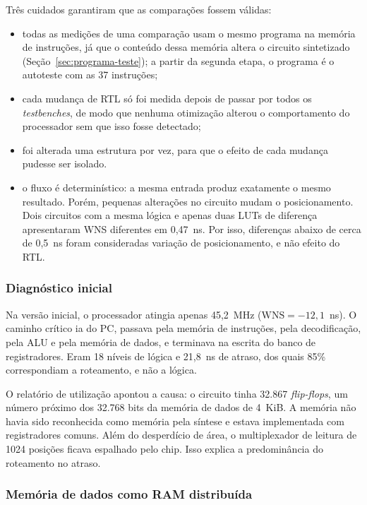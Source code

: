 Três cuidados garantiram que as comparações fossem válidas:
\begin{itemize}
  \item todas as medições de uma comparação usam o mesmo programa na memória
    de instruções, já que o conteúdo dessa memória altera o circuito
    sintetizado (Seção~\ref{sec:programa-teste}); a partir da segunda etapa,
    o programa é o autoteste com as 37 instruções;
  \item cada mudança de RTL só foi medida depois de passar por todos os
    \textit{testbenches}, de modo que nenhuma otimização alterou o
    comportamento do processador sem que isso fosse detectado;
  \item foi alterada uma estrutura por vez, para que o efeito de cada
    mudança pudesse ser isolado.
  \item o fluxo é determinístico: a mesma entrada produz exatamente o mesmo
    resultado. Porém, pequenas alterações no circuito mudam o posicionamento.
    Dois circuitos com a mesma lógica e apenas duas LUTs de diferença
    apresentaram WNS diferentes em 0,47~ns. Por isso, diferenças abaixo de
    cerca de 0,5~ns foram consideradas variação de posicionamento, e não
    efeito do RTL.
\end{itemize}

\subsubsection{Diagnóstico inicial}

Na versão inicial, o processador atingia apenas 45,2~MHz
($\mathrm{WNS} = -12{,}1$~ns). O caminho crítico ia do PC, passava pela
memória de instruções, pela decodificação, pela ALU e pela memória de
dados, e terminava na escrita do banco de registradores. Eram 18 níveis de
lógica e 21,8~ns de atraso, dos quais 85\% correspondiam a roteamento, e não
a lógica.

O relatório de utilização apontou a causa: o circuito tinha 32.867
\textit{flip-flops}, um número próximo dos 32.768 bits da memória de dados
de 4~KiB. A memória não havia sido reconhecida como memória pela síntese e
estava implementada com registradores comuns. Além do desperdício de área,
o multiplexador de leitura de 1024 posições ficava espalhado pelo chip. Isso
explica a predominância do roteamento no atraso.

\subsubsection{Memória de dados como RAM distribuída}

